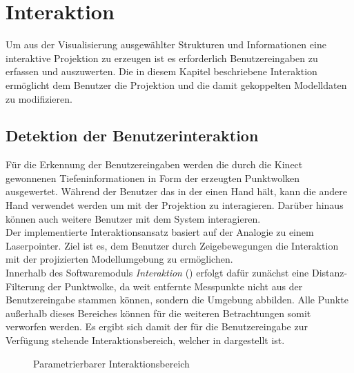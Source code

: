 \chapter{Interaktion}
\label{chap.interaction}
Um aus der Visualisierung ausgewählter Strukturen und Informationen eine interaktive Projektion zu erzeugen ist es erforderlich Benutzereingaben zu erfassen und auszuwerten. Die in diesem Kapitel beschriebene Interaktion ermöglicht dem Benutzer die Projektion und die damit gekoppelten Modelldaten zu modifizieren.

\section{Detektion der Benutzerinteraktion}
Für die Erkennung der Benutzereingaben werden die durch die Kinect gewonnenen Tiefeninformationen in Form der erzeugten Punktwolken ausgewertet. Während der Benutzer das \kps{} in der einen Hand hält, kann die andere Hand verwendet werden um mit der Projektion zu interagieren. Darüber hinaus können auch weitere Benutzer mit dem System interagieren.\\

Der implementierte Interaktionsansatz basiert auf der Analogie zu einem Laserpointer. Ziel ist es, dem Benutzer durch Zeigebewegungen die Interaktion mit der projizierten Modellumgebung zu ermöglichen.\\
Innerhalb des Softwaremoduls \textit{Interaktion} () erfolgt dafür zunächst eine Distanz-Filterung der Punktwolke, da weit entfernte Messpunkte nicht aus der Benutzereingabe stammen können, sondern die Umgebung abbilden. Alle Punkte außerhalb dieses Bereiches können für die weiteren Betrachtungen somit verworfen werden. Es ergibt sich damit der für die Benutzereingabe zur Verfügung stehende Interaktionsbereich, welcher in  dargestellt ist.\\

\begin{figure}[!ht]
	\begin{center}
		\caption{Parametrierbarer Interaktionsbereich}
		\label{fig.intfov}
	\end{center}
\end{figure}

